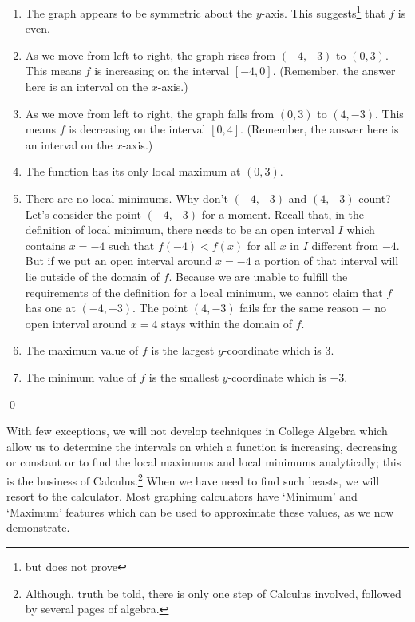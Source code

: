 \begin{ex}
\begin{enumerate}
\vspace{-.1in}

\item  The graph appears to be symmetric about the $y$-axis.  This suggests\footnote{but does not prove} that $f$ is even.

\item  As we move from left to right, the graph rises from $(-4,-3)$ to $(0,3)$.  This means $f$ is increasing on the interval $[-4,0]$.  (Remember, the answer here is an interval on the $x$-axis.)

\item  As we move from left to right, the graph falls from $(0,3)$ to $(4,-3)$.  This means $f$ is decreasing on the interval $[0,4]$.  (Remember, the answer here is an interval on the $x$-axis.)

\item  The function has its only local maximum at $(0,3)$.

\item  There are no local minimums.  Why don't $(-4, -3)$ and $(4, -3)$ count?  Let's consider the point $(-4, -3)$ for a moment.  Recall that, in the definition of local minimum, there needs to be an open interval $I$ which contains $x = -4$ such that $f(-4) < f(x)$ for all $x$ in $I$ different from $-4$.  But if we put an open interval around $x= -4$ a portion of that interval will lie outside of the domain of $f$.  Because we are unable to fulfill the requirements of the definition for a local minimum, we cannot claim that $f$ has one at $(-4, -3)$.  The point $(4, -3)$ fails for the same reason $-$ no open interval around $x = 4$ stays within the domain of $f$.

\item  The maximum value of $f$ is the largest $y$-coordinate which is $3$.

\item  The minimum value of $f$ is the smallest $y$-coordinate which is $-3$.

\end{enumerate}

\end{ex} 

\vspace{-.32in} \qed

\smallskip

With few exceptions, we will not develop techniques in College Algebra which allow us to determine the intervals on which a function is increasing, decreasing or constant or to find the local maximums and local minimums analytically;  this is the business of Calculus.\footnote{Although, truth be told, there is only one step of Calculus involved, followed by several pages of algebra.}  When we have need to find such beasts, we will resort to the calculator.  Most graphing calculators have `Minimum' and `Maximum' features which can be used to approximate these values, as we now demonstrate.


